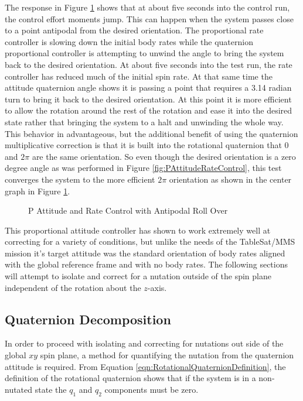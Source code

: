 The response in Figure \ref{fig:PAttitudeRateControlWithAntipodalRollOver} shows that at about five seconds into the control run, the control effort moments jump.  This can happen when the system passes close to a point antipodal from the desired orientation.  The proportional rate controller is slowing down the initial body rates while the quaternion proportional controller is attempting to unwind the angle to bring the system back to the desired orientation.  At about five seconds into the test run, the rate controller has reduced much of the initial spin rate.  At that same time the attitude quaternion angle shows it is passing a point that requires a 3.14 radian turn to bring it back to the desired orientation.  At this point it is more efficient to allow the rotation around the rest of the rotation and ease it into the desired state rather that bringing the system to a halt and unwinding the whole way.  This behavior in advantageous, but the additional benefit of using the quaternion multiplicative correction is that it is built into the rotational quaternion that 0 and $2\pi$ are the same orientation.  So even though the desired orientation is a zero degree angle as was performed in Figure \ref{fig:PAttitudeRateControl}, this test converges the system to the more efficient $2\pi$ orientation as shown in the center graph in Figure \ref{fig:PAttitudeRateControlWithAntipodalRollOver}.

\begin{figure}[H]
  \centerline{}
  \caption{P Attitude and Rate Control with Antipodal Roll Over}
  \label{fig:PAttitudeRateControlWithAntipodalRollOver}
\end{figure}

This proportional attitude controller has shown to work extremely well at correcting for a variety of conditions, but unlike the needs of the TableSat/MMS mission it's target attitude was the standard orientation of body rates aligned with the global reference frame and with no body rates.  The following sections will attempt to isolate and correct for a nutation outside of the spin plane independent of the rotation about the $z$-axis.

\subsection{Quaternion Decomposition}
\label{subsec:QuaternionDecomposition}

In order to proceed with isolating and correcting for nutations out side of the global $xy$ spin plane, a method for quantifying the nutation from the quaternion attitude is required.  From Equation \ref{eqn:RotationalQuaternionDefinition}, the definition of the rotational quaternion shows that if the system is in a non-nutated state the $q_1$ and $q_2$ components must be zero.

